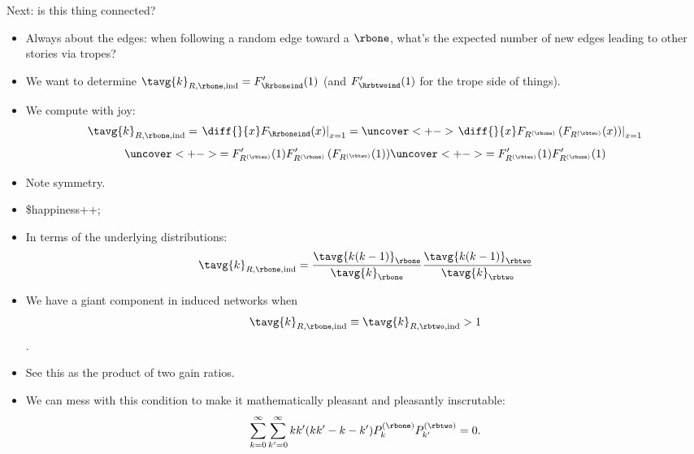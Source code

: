 \begin{frame}

  \begin{block}{Next: is this thing connected?}
    \begin{itemize}
    \item<+->
      Always about the edges: when following a random edge toward
      a $\rbone$, what's the expected number
      of new edges leading to other stories via tropes?
    \item<+->
      We want to determine $\tavg{k}_{R,\rbone,\textnormal{ind}} = F'_{\Rrboneind}(1)$ 
      (and $F'_{\Rrbtwoind}(1)$ for the trope side of things).
    \item<+->
      We compute with joy:
      $$
      \tavg{k}_{R,\rbone,\textnormal{ind}}
      =
      \left.
      \diff{}{x}
        F_{\Rrboneind}(x)
      \right|_{x=1}
      =
      \uncover<+->{
      \left.
      \diff{}{x}
        F_{R^{(\rbone)}}
        \left(
          F_{R^{(\rbtwo)}}(x)      
        \right)
      \right|_{x=1}
    }
    $$
    $$
    \uncover<+->{
      =
      F'_{R^{(\rbtwo)}}(1)
        F'_{R^{(\rbone)}}
        \left(
          F_{R^{(\rbtwo)}}(1)
        \right)
      }
      \uncover<+->{
        =
        F'_{R^{(\rbtwo)}}(1)
        F'_{R^{(\rbone)}}(1)
      }
      $$
    \item<+->
      Note symmetry. 
    \item<+->
      \$happiness++;
    \end{itemize}
  \end{block}
  
\end{frame}

\begin{frame}

  \begin{block}{}
    \begin{itemize}
    \item<+->
      In terms of the underlying distributions:
      $$
      \tavg{k}_{R,\rbone,\textnormal{ind}}
      =
      \frac{\tavg{k(k-1)}_{\rbone}}
      {\tavg{k}_{\rbone}}
      \frac{\tavg{k(k-1)}_{\rbtwo}}
      {\tavg{k}_{\rbtwo}}
      $$
    \item<+->
      We have a giant component in  
      induced networks when 
      $$
      \tavg{k}_{R,\rbone,\textnormal{ind}}
      \equiv
      \tavg{k}_{R,\rbtwo,\textnormal{ind}}
      > 1
      $$.
    \item<+->
      See this as the product of two gain ratios. \newline
    \item<+->
      We can mess with this condition to make it mathematically pleasant
      and pleasantly inscrutable:
      $$
      \sum_{k=0}^{\infty}
      \sum_{k'=0}^{\infty}
      kk'(kk'-k-k') P^{(\rbone)}_{k} P^{(\rbtwo)}_{k'} = 0.
      $$
    \end{itemize}
  \end{block}

\end{frame}

